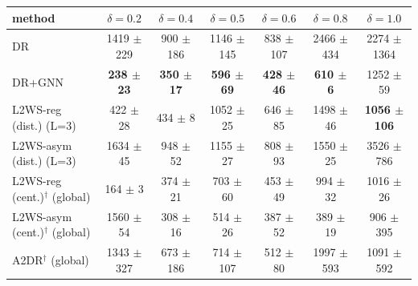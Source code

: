 
\begin{tabular}{lcccccc}
\toprule
method & $\delta=0.2$ & $\delta=0.4$ & $\delta=0.5$ & $\delta=0.6$ & $\delta=0.8$ & $\delta=1.0$ \\
\midrule
DR & 1419 $\pm$ 229 & 900 $\pm$ 186 & 1146 $\pm$ 145 & 838 $\pm$ 107 & 2466 $\pm$ 434 & 2274 $\pm$ 1364 \\
\midrule
DR+GNN & \textbf{238 $\pm$ 23} & \textbf{350 $\pm$ 17} & \textbf{596 $\pm$ 69} & \textbf{428 $\pm$ 46} & \textbf{610 $\pm$ 6} & 1252 $\pm$ 59 \\
L2WS-reg (dist.) (L=3) & 422 $\pm$ 28 & 434 $\pm$ 8 & 1052 $\pm$ 25 & 646 $\pm$ 85 & 1498 $\pm$ 46 & \textbf{1056 $\pm$ 106} \\
L2WS-asym (dist.) (L=3) & 1634 $\pm$ 45 & 948 $\pm$ 52 & 1155 $\pm$ 27 & 808 $\pm$ 93 & 1550 $\pm$ 25 & 3526 $\pm$ 786 \\
\midrule
L2WS-reg (cent.)$^\dagger$ (global) & 164 $\pm$ 3 & 374 $\pm$ 21 & 703 $\pm$ 60 & 453 $\pm$ 49 & 994 $\pm$ 32 & 1016 $\pm$ 26 \\
L2WS-asym (cent.)$^\dagger$ (global) & 1560 $\pm$ 54 & 308 $\pm$ 16 & 514 $\pm$ 26 & 387 $\pm$ 52 & 389 $\pm$ 19 & 906 $\pm$ 395 \\
A2DR$^\dagger$ (global) & 1343 $\pm$ 327 & 673 $\pm$ 186 & 714 $\pm$ 107 & 512 $\pm$ 80 & 1997 $\pm$ 593 & 1091 $\pm$ 592 \\
\bottomrule
\end{tabular}
